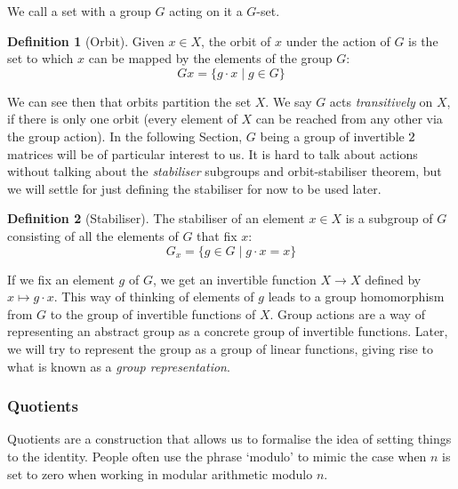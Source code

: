 \documentclass{article}
\theoremstyle{definition}
\newtheorem{definition}{Definition}[section]
\theoremstyle{definition}
\theoremstyle{definition}
\begin{document}
We call a set with a group $G$ acting on it a $G$-set. 
   

\begin{definition}[Orbit]
 Given $x\in X$, the orbit of $x$ under the action of $G$ is the set  to which $x$ can be mapped by the elements of the group $G$: $$Gx=\{g\cdot x \mid g\in G\}$$
\end{definition}
We can see then that orbits partition the set $X$. We say $G$ acts \emph{transitively} on $X$, if there is only one orbit (every element of $X$ can be reached from any other via the group action).
\newline\newline
In the following Section, $G$ being a group of invertible $2\time 2$ matrices will be of particular interest to us. 
\newline\newline
It is hard to talk about actions without talking about the \emph{stabiliser} subgroups and orbit-stabiliser theorem, but we will settle for just defining the stabiliser for now to be used later.
\newline\newline
\begin{definition}[Stabiliser]
    The stabiliser of an element $x\in X$ is a subgroup of $G$ consisting of all the elements of $G$ that fix $x$: $$G_x=\{g\in G \mid g\cdot x=x\}$$
\end{definition}

If we fix an element $g$ of $G$, we get an invertible function $X\to X$ defined by $x\mapsto g\cdot x.$ This way of thinking of elements of $g$ leads to a group homomorphism
from $G$ to the group of invertible functions of $X$.
\newline\newline
Group actions are a way of representing an abstract group as a concrete group of invertible functions. Later, we will try to represent the group as a group of linear functions, giving rise to what is known as a \emph{group representation}.


\subsubsection{Quotients}

Quotients are a construction that allows us to formalise the idea of setting things to the identity. People often use the phrase `modulo' to mimic the case when $n$ is set to zero when working in modular arithmetic modulo $n$.
\end{document}
